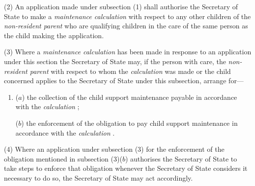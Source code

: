 \documentclass[12pt,a4paper]{article}
\begin{document}
(2) An application made under subsection (1)  shall authorise the 
Secretary of State  %
to make a 
\emph{maintenance calculation}  %
with respect to any other children of the 
\emph{non-resident parent}  %
who are qualifying children in the care of the same person as the child making the application.

(3) Where a 
\emph{maintenance calculation}  %
has been made in response to an application under this section the 
Secretary of State  %
may, if the person with care, the 
\emph{non-resident parent}  %
with respect to whom the 
\emph{calculation}  %
was made or the child concerned applies to 
the Secretary of State  %
under this subsection, arrange for—
\begin{enumerate}\item[]
($a$) the collection of the child support maintenance payable in accordance with the 
\emph{calculation}%
;

($b$) the enforcement of the obligation to pay child support maintenance in accordance with the 
\emph{calculation}%
.
\end{enumerate}

(4) Where an application under subsection (3)  for the enforcement of the obligation mentioned in subsection (3)($b$)  authorises the 
Secretary of State  %
to take steps to enforce that obligation whenever 
the Secretary of State  %
considers it necessary to do so, the 
Secretary of State  %
may act accordingly.
\end{document}

